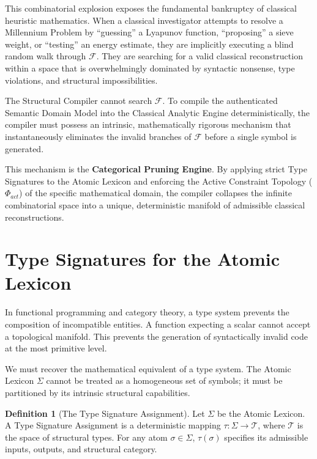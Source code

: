 \documentclass[12pt,openany]{extbook}
\theoremstyle{plain}
\theoremstyle{definition}
\newtheorem{definition}{Definition}[chapter]
\begin{document}
This combinatorial explosion exposes the fundamental bankruptcy of classical heuristic mathematics. When a classical investigator attempts to resolve a Millennium Problem by ``guessing'' a Lyapunov function, ``proposing'' a sieve weight, or ``testing'' an energy estimate, they are implicitly executing a blind random walk through $\mathcal{F}$. They are searching for a valid classical reconstruction within a space that is overwhelmingly dominated by syntactic nonsense, type violations, and structural impossibilities.

The Structural Compiler cannot search $\mathcal{F}$. To compile the authenticated Semantic Domain Model into the Classical Analytic Engine deterministically, the compiler must possess an intrinsic, mathematically rigorous mechanism that instantaneously eliminates the invalid branches of $\mathcal{F}$ before a single symbol is generated. 

This mechanism is the \textbf{Categorical Pruning Engine}. By applying strict Type Signatures to the Atomic Lexicon and enforcing the Active Constraint Topology ($\Phi_{act}$) of the specific mathematical domain, the compiler collapses the infinite combinatorial space into a unique, deterministic manifold of admissible classical reconstructions.

\section{Type Signatures for the Atomic Lexicon}

In functional programming and category theory, a type system prevents the composition of incompatible entities. A function expecting a scalar cannot accept a topological manifold. This prevents the generation of syntactically invalid code at the most primitive level.

We must recover the mathematical equivalent of a type system. The Atomic Lexicon $\Sigma$ cannot be treated as a homogeneous set of symbols; it must be partitioned by its intrinsic structural capabilities.

\begin{definition}[The Type Signature Assignment]
Let $\Sigma$ be the Atomic Lexicon. A Type Signature Assignment is a deterministic mapping $\tau: \Sigma \to \mathcal{T}$, where $\mathcal{T}$ is the space of structural types. For any atom $\sigma \in \Sigma$, $\tau(\sigma)$ specifies its admissible inputs, outputs, and structural category.
\end{definition}
\end{document}
